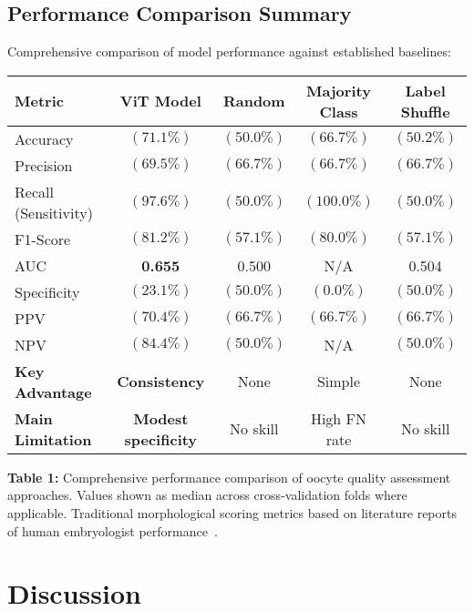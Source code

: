\documentclass[pdflatex,sn-basic]{sn-jnl}%
\begin{document}
\subsection{Performance Comparison Summary}

Comprehensive comparison of model performance against established baselines:

\begin{center}
\small
\begin{tabular}{lcccc}
\hline
\textbf{Metric} & \textbf{ViT Model} & \textbf{Random} & \textbf{Majority Class} & \textbf{Label Shuffle} \\
\hline
Accuracy & \textbf{$(71.1\%)$} & $(50.0\%)$ & $(66.7\%)$ & $(50.2\%)$ \\
Precision & \textbf{$(69.5\%)$} & $(66.7\%)$ & $(66.7\%)$ & $(66.7\%)$ \\
Recall (Sensitivity) & $(97.6\%)$ & $(50.0\%)$ & \textbf{$(100.0\%)$} & $(50.0\%)$ \\
F1-Score & \textbf{$(81.2\%)$} & $(57.1\%)$ & $(80.0\%)$ & $(57.1\%)$ \\
AUC & \textbf{0.655} & 0.500 & N/A & 0.504 \\
Specificity & $(23.1\%)$ & \textbf{$(50.0\%)$} & $(0.0\%)$ & \textbf{$(50.0\%)$} \\
PPV & \textbf{$(70.4\%)$} & $(66.7\%)$ & $(66.7\%)$ & $(66.7\%)$ \\
NPV & \textbf{$(84.4\%)$} & $(50.0\%)$ & N/A & $(50.0\%)$ \\
\hline
\textbf{Key Advantage} & \textbf{Consistency} & None & Simple & None \\
\textbf{Main Limitation} & \textbf{Modest specificity} & No skill & High FN rate & No skill \\
\hline
\end{tabular}
\end{center}

\textbf{Table 1:} Comprehensive performance comparison of oocyte quality assessment approaches. Values shown as median across cross-validation folds where applicable. Traditional morphological scoring metrics based on literature reports of human embryologist performance~\cite{paternot2009observer,paternot2011multicentre,fordham2022embryologist}. 

\section{Discussion}\label{sec:discussion}
\end{document}
